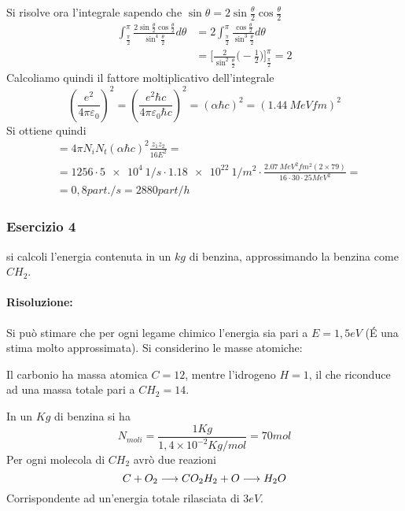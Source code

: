 Si risolve ora l'integrale sapendo che $\sin\theta=2\sin\frac{\theta}{2}\cos\frac{\theta}{2}$ 
\begin{equation}
\begin{split}
\int_{\frac{\pi}{2}}^{\pi}\frac{2\sin\frac{\theta}{2}\cos\frac{\theta}{2}}{\sin^4\frac{\theta}{2}}d\theta&=2\int_{\frac{\pi}{2}}^{\pi}\frac{\cos\frac{\theta}{2}}{\sin^3\frac{\theta}{2}}d\theta\\
&=\biggl[\frac{2}{\sin^2\frac{\theta}{2}}\biggl(-\frac{1}{2}\biggl)\biggl]^\pi_{\frac{\pi}{2}}=2
\end{split}
\end{equation}
Calcoliamo quindi il fattore moltiplicativo dell'integrale
\begin{equation}
\left(\frac{e^2}{4\pi\varepsilon_0}\right)^2=\left(\frac{e^2\hbar c}{4\pi\varepsilon_0 \hbar c}\right)^2=(\alpha \hbar c)^2=(\SI{1,44}{MeV fm})^2
\end{equation}
Si ottiene quindi
\begin{equation}
\begin{split}
&=4\pi N_iN_t(\alpha \hbar c)^2\frac{z_1z_2}{16E^2}=\\
&=1256\cdot\SI{5e4}{1/s}\cdot\SI{1,18e22}{1/m^2}\cdot\frac{\SI{2,07}{MeV^2 fm^2}(2\times 79)}{16\cdot30\cdot25 MeV^2}=\\
&=0,8part./s=2880part/h
\end{split}
\end{equation}

\newpage
\subsubsection{Esercizio 4}
si calcoli l'energia contenuta in un $kg$ di benzina, approssimando la benzina come $CH_2$.
\paragraph{Risoluzione:}
Si può stimare che per ogni legame chimico l'energia sia pari a $E=1,5eV$ (\'E una stima molto approssimata).
Si considerino le masse atomiche:

Il carbonio ha massa atomica $C=12$, mentre l'idrogeno $H=1$, il che riconduce ad una massa totale pari a $CH_2=14$.

In un $Kg$ di benzina si ha
\begin{equation}
N_{moli} =\frac{1Kg}{1,4\times 10^{-2}Kg/mol}=70mol
\end{equation}
Per ogni molecola di $CH_2$ avrò due reazioni
\begin{equation}
C+O_2\longrightarrow CO_2\\
H_2+O\longrightarrow H_2O
\end{equation}
Corrispondente ad un'energia totale rilasciata di $3eV$.

